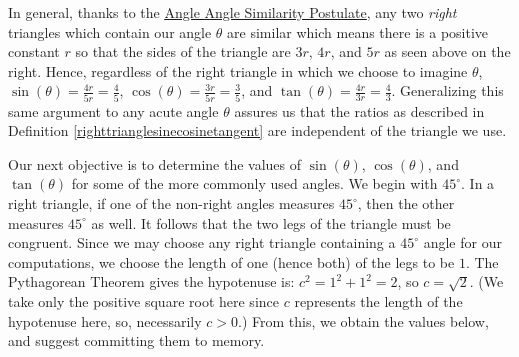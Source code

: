 \documentclass{ximera}
\begin{document}
\begin{image}
\end{image}


In general, thanks to the  \href{https://en.wikipedia.org/wiki/AA_postulate}{\underline{Angle Angle Similarity Postulate}},  any two \textit{right} triangles which contain our angle $\theta$ are similar which means there is a positive constant $r$ so that the sides of the triangle are $3r$, $4r$, and $5r$ as seen above on the right.  Hence, regardless of the right triangle in which we choose to imagine $\theta$,  $\sin(\theta) = \frac{4r}{5r} = \frac{4}{5}$, $\cos(\theta) = \frac{3r}{5r} = \frac{3}{5}$, and $\tan(\theta) = \frac{4r}{3r}  = \frac{4}{3}$.  Generalizing this same argument to any acute angle $\theta$ assures us that the ratios as described in Definition \ref{righttrianglesinecosinetangent} are independent of the triangle we use.



Our next objective is to determine the values of $\sin(\theta)$, $\cos(\theta)$, and $\tan(\theta)$ for some of the more commonly used angles.  We begin with $45^{\circ}$.  In a right triangle, if one of the non-right angles measures $45^{\circ}$, then the other measures $45^{\circ}$ as well.  It follows that the two legs of the triangle must be congruent.  Since we may choose any right triangle containing a $45^{\circ}$ angle for our computations, we choose the length of one (hence both) of the legs to be $1$.  The Pythagorean Theorem gives the hypotenuse is:  $c^2 = 1^2+1^2 = 2$, so $c = \sqrt{2}$. (We take only the positive square root here since $c$ represents the length of the hypotenuse here, so, necessarily $c>0$.)  From this, we obtain the values below, and suggest committing them to memory. 
\end{document}
